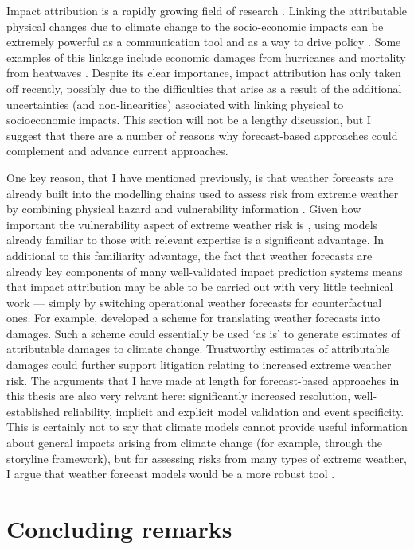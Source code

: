       Impact attribution is a rapidly growing field of research \citep{perkins-kirkpatrick_attribution_2022,burger_law_2020}. Linking the attributable physical changes due to climate change to the socio-economic impacts can be extremely powerful as a communication tool and as a way to drive policy \citep{clarke_inventories_2021}. Some examples of this linkage include economic damages from hurricanes \citep{frame_economic_2020,strauss_economic_2021} and mortality from heatwaves \citep{mitchell_attributing_2016,mitchell_climate_2021,lo_estimating_2022}. Despite its clear importance, impact attribution has only taken off recently, possibly due to the difficulties that arise as a result of the additional uncertainties (and non-linearities) associated with linking physical to socioeconomic impacts. This section will not be a lengthy discussion, but I suggest that there are a number of reasons why forecast-based approaches could complement and advance current approaches.

      One key reason, that I have mentioned previously, is that weather forecasts are already built into the modelling chains used to assess risk from extreme weather by combining physical hazard and vulnerability information \citep{schaller_role_2020}. Given how important the vulnerability aspect of extreme weather risk is \citep{raju_stop_2022,mitchell_increased_2022}, using models already familiar to those with relevant expertise is a significant advantage. In additional to this familiarity advantage, the fact that weather forecasts are already key components of many well-validated impact prediction systems \citep[for example, the GloFAS flood warning system][]{alfieri_glofas_2013} means that impact attribution may be able to be carried out with very little technical work --- simply by switching operational weather forecasts for counterfactual ones. For example, \citet{wilkinson_consequence_2022} developed a scheme for translating weather forecasts into damages. Such a scheme could essentially be used `as is' to generate estimates of attributable damages to climate change. Trustworthy estimates of attributable damages could further support litigation relating to increased extreme weather risk. The arguments that I have made at length for forecast-based approaches in this thesis are also very relvant here: significantly increased resolution, well-established reliability, implicit and explicit model validation and event specificity. This is certainly not to say that climate models cannot provide useful information about general impacts arising from climate change (for example, through the storyline framework), but for assessing risks from many types of extreme weather, I argue that weather forecast models would be a more robust tool \citep{palmer_simple_2018}.

\section{Concluding remarks}
